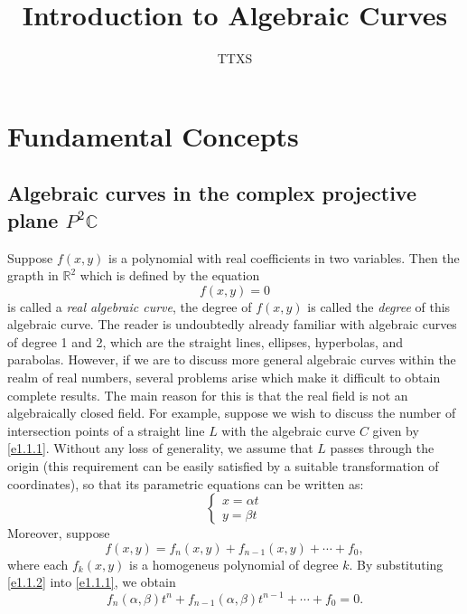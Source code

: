 \documentclass{book}
\title{Introduction to Algebraic Curves}
\author{TTXS}
\def\R{\mathbb{R}}
\def\C{\mathbb{C}}
\begin{document}
    \maketitle
    \tableofcontents
    \chapter{Fundamental Concepts}
    \section{Algebraic curves in the complex projective plane \texorpdfstring{$P^2\C$}{P2C}}
    Suppose $f(x,y)$ is a polynomial with real coefficients in two variables. Then the grapth in $\R^2$ which is defined by the equation
    \begin{equation}\label{e1.1.1}
        f(x,y)=0
    \end{equation}
    is called a \textit{real algebraic curve}, the degree of $f(x,y)$ is called the \textit{degree} of this algebraic curve. The reader is undoubtedly already familiar with algebraic curves of degree 1 and 2, which are the straight lines, ellipses, hyperbolas, and parabolas. However, if we are to discuss more general algebraic curves within the realm of real numbers, several problems arise which make it difficult to obtain complete results. The main reason for this is that the real field is not an algebraically closed field. For example, suppose we wish to discuss the number of intersection points of a straight line $L$ with the algebraic curve $C$ given by \eqref{e1.1.1}. Without any loss of generality, we assume that $L$ passes through the origin (this requirement can be easily satisfied by a suitable transformation of coordinates), so that its parametric equations can be written as: 
    \begin{equation}\label{e1.1.2}
        \begin{cases}
            x=\alpha t\\
            y=\beta t
        \end{cases}
    \end{equation}
    Moreover, suppose
    $$f(x,y)=f_n(x,y)+f_{n-1}(x,y)+\cdots+f_0, $$
    where each $f_k(x,y)$ is a homogeneus polynomial of degree $k$. By substituting \eqref{e1.1.2} into \eqref{e1.1.1}, we obtain
    \begin{equation}\label{e1.1.3}
        f_n(\alpha,\beta)t^n+f_{n-1}(\alpha,\beta)t^{n-1}+\cdots+f_0=0. 
    \end{equation}
    
\end{document}
